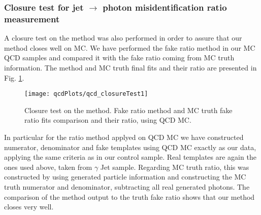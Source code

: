 \subsubsection{Closure test for jet $\rightarrow$ photon misidentification ratio measurement}

A closure test on the method was also performed in order to assure that our method closes well on MC.
We have performed the fake ratio method in our MC QCD samples and compared it with the fake ratio coming from MC truth information. 
The method and MC truth final fits and their ratio are presented in Fig. \ref{fig:qcd_closureTest1}.

\begin{figure}[hbtp]
\begin{center}
\texttt{[image: qcdPlots/qcd\_closureTest1]}
\caption{Closure test on the method. Fake ratio method and MC truth fake ratio fits comparison and their ratio, using QCD MC.}
\label{fig:qcd_closureTest1}
\end{center}
\end{figure}

In particular for the ratio method applyed on QCD MC we have constructed numerator, denominator and fake templates using QCD MC exactly as our data,
applying the same criteria as in our control sample. Real templates are again the ones used above, taken from $\gamma$ Jet sample.
Regarding MC truth ratio, this was constructed by using generated particle information and constructing the MC truth numerator and denominator, 
subtracting all real generated photons. The comparison of the method output to the truth fake ratio shows that our method closes very well.



